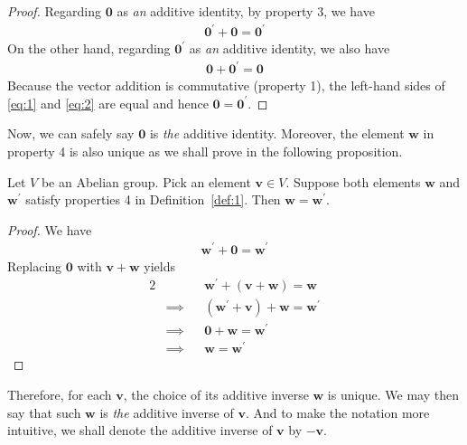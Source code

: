 \documentclass[thmcnt=section, color=cyan, 12pt]{my-elegantbook}
\begin{document}
\begin{proof}
	Regarding $\mathbf{0}$ as \textit{an} additive identity, by property 3,
	we have
	\begin{align}
		\mathbf{0}^\prime + \mathbf{0} = \mathbf{0}^\prime
		\label{eq:1}
	\end{align}
	On the other hand, regarding $\mathbf{0}^\prime$ as \textit{an} additive identity,
	we also have
	\begin{align}
		\mathbf{0} + \mathbf{0}^\prime = \mathbf{0}
		\label{eq:2}
	\end{align}
	Because the vector addition is commutative (property 1),
	the left-hand sides of \eqref{eq:1} and \eqref{eq:2} are equal
	and hence $\mathbf{0} = \mathbf{0}^\prime$.
\end{proof}

Now, we can safely say $\mathbf{0}$ is \textit{the} additive identity.
Moreover, the element $\mathbf{w}$ in property 4 is also unique
as we shall prove in the following proposition.

\begin{proposition}
	Let $V$ be an Abelian group.
	Pick an element $\mathbf{v} \in V$.
	Suppose both elements $\mathbf{w}$ and $\mathbf{w}^\prime$
	satisfy properties 4 in Definition~\ref{def:1}.
	Then $\mathbf{w} = \mathbf{w}^\prime$.
\end{proposition}

\begin{proof}
	We have
	\begin{align*}
		\mathbf{w}^\prime + \mathbf{0} = \mathbf{w}^\prime
	\end{align*}
	Replacing $\mathbf{0}$ with $\mathbf{v} + \mathbf{w}$ yields
	\begin{alignat*}{2}
		 &          &  & \mathbf{w}^\prime + (\mathbf{v} + \mathbf{w}) = \mathbf{w}        \\
		 & \implies &  & (\mathbf{w}^\prime + \mathbf{v}) + \mathbf{w} = \mathbf{w}^\prime \\
		 & \implies &  & \mathbf{0} + \mathbf{w} = \mathbf{w}^\prime                       \\
		 & \implies &  & \mathbf{w} = \mathbf{w}^\prime
	\end{alignat*}
\end{proof}

Therefore, for each $\mathbf{v}$, the choice of its
additive inverse $\mathbf{w}$ is unique.
We may then say that such $\mathbf{w}$ is \textit{the} additive inverse of $\mathbf{v}$.
And to make the notation more intuitive, we shall denote
the additive inverse of $\mathbf{v}$ by $-\mathbf{v}$.


\printbibliography[heading=bibintoc, title=References]


\printindex
\end{document}

